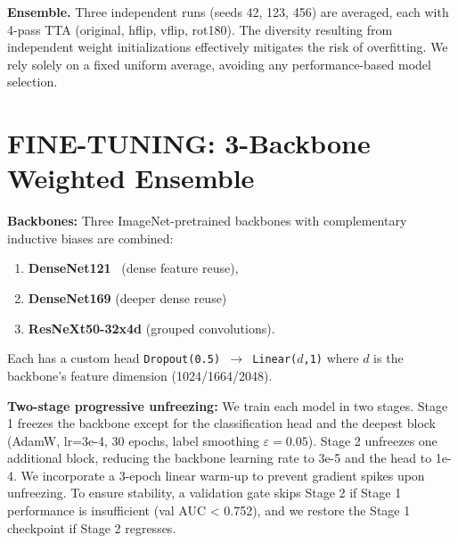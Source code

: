 \documentclass[a4paper, 10pt, twocolumn]{article}
\begin{document}
\textbf{Ensemble.}
Three independent runs (seeds 42, 123, 456) are averaged, each with
4-pass TTA (original, hflip, vflip, rot180). 
The diversity resulting from independent weight initializations effectively mitigates the risk of  overfitting. We rely solely on a fixed uniform average, avoiding any performance-based model selection.


\section{FINE-TUNING: 3-Backbone Weighted Ensemble}

\textbf{Backbones:} Three ImageNet-pretrained backbones with complementary
inductive biases are combined: 
\begin{enumerate}[topsep=0pt, itemsep=1pt]
    \item \textbf{DenseNet121}~\cite{huang2017densely} (dense feature reuse),
    \item  \textbf{DenseNet169} (deeper dense reuse)
    \item \textbf{ResNeXt50-32x4d} (grouped convolutions). 
\end{enumerate}


Each has a custom head \texttt{Dropout(0.5) $\to$ Linear($d$,1)} where $d$ is the backbone's feature dimension (1024/1664/2048).
    
\textbf{Two-stage progressive unfreezing:} We train each model in two stages. Stage 1 freezes the backbone except for the classification head and the deepest block (AdamW, lr=3e-4, 30 epochs, label smoothing $\varepsilon=0.05$). Stage 2 unfreezes one additional block, reducing the backbone learning rate to 3e-5 and the head to 1e-4. We incorporate a 3-epoch linear warm-up to prevent gradient spikes upon unfreezing. To ensure stability, a validation gate skips Stage 2 if Stage 1 performance is insufficient (val AUC < 0.752), and we restore the Stage 1 checkpoint if Stage 2 regresses.
\end{document}
